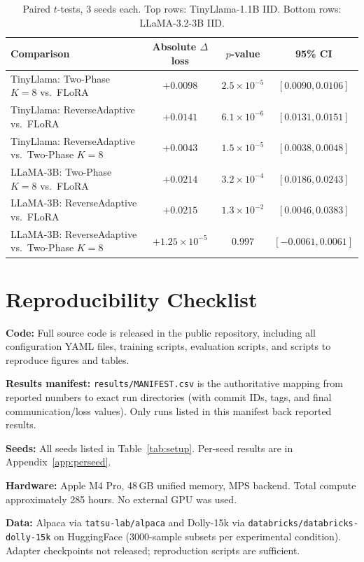 \begin{table}[H]
\caption{Paired $t$-tests, 3 seeds each. Top rows: TinyLlama-1.1B IID. Bottom rows: LLaMA-3.2-3B IID.}
\label{tab:d1}
\begin{center}
\small
\begin{tabular}{lccc}
\toprule
Comparison & Absolute $\Delta$ loss & $p$-value & 95\% CI \\
\midrule
TinyLlama: Two-Phase $K{=}8$ vs.\ FLoRA & $+0.0098$ & $2.5 \times 10^{-5}$ & $[0.0090, 0.0106]$ \\
TinyLlama: ReverseAdaptive vs.\ FLoRA & $+0.0141$ & $6.1 \times 10^{-6}$ & $[0.0131, 0.0151]$ \\
TinyLlama: ReverseAdaptive vs.\ Two-Phase $K{=}8$ & $+0.0043$ & $1.5 \times 10^{-5}$ & $[0.0038, 0.0048]$ \\
LLaMA-3B: Two-Phase $K{=}8$ vs.\ FLoRA & $+0.0214$ & $3.2 \times 10^{-4}$ & $[0.0186, 0.0243]$ \\
LLaMA-3B: ReverseAdaptive vs.\ FLoRA & $+0.0215$ & $1.3 \times 10^{-2}$ & $[0.0046, 0.0383]$ \\
LLaMA-3B: ReverseAdaptive vs.\ Two-Phase $K{=}8$ & $+1.25 \times 10^{-5}$ & $0.997$ & $[-0.0061, 0.0061]$ \\
\bottomrule
\end{tabular}
\end{center}
\end{table}

\section{Reproducibility Checklist}
\label{app:repro}
\textbf{Code:} Full source code is released in the public repository, including all configuration YAML files, training scripts, evaluation scripts, and scripts to reproduce figures and tables.

\textbf{Results manifest:} \texttt{results/MANIFEST.csv} is the authoritative mapping from reported numbers to exact run directories (with commit IDs, tags, and final communication/loss values). Only runs listed in this manifest back reported results.

\textbf{Seeds:} All seeds listed in Table~\ref{tab:setup}. Per-seed results are in Appendix~\ref{app:perseed}.

\textbf{Hardware:} Apple M4 Pro, 48\,GB unified memory, MPS backend. Total compute approximately 285 hours. No external GPU was used.

\textbf{Data:} Alpaca \citep{taori2023alpaca} via \texttt{tatsu-lab/alpaca} and Dolly-15k via \texttt{databricks/databricks-dolly-15k} on HuggingFace (3000-sample subsets per experimental condition). Adapter checkpoints not released; reproduction scripts are sufficient.

